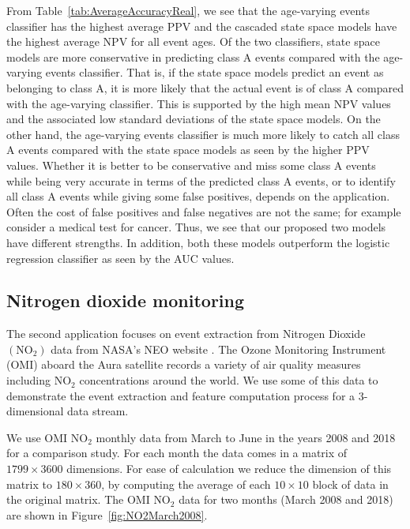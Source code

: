\documentclass[a4paper,11pt]{article}
\begin{document}
From Table~\ref{tab:AverageAccuracyReal}, we see that the age-varying events classifier has the highest average PPV and the cascaded state space models have the highest average NPV for all event ages. Of the two classifiers, state space models are more conservative in predicting class A events compared with the age-varying events classifier. That is, if the state space models predict an event as belonging to class A, it is more likely that the actual event is of class A compared with the age-varying classifier. This is supported by the high mean NPV values and the associated low standard deviations of the state space models. On the other hand, the age-varying events classifier is much more likely to catch all class A events compared with the state space models as seen by the higher PPV values. Whether it is better to be conservative and miss some class A events while being very accurate in terms of the predicted class A events, or to identify all class A events while giving some false positives, depends on the application. Often the cost of  false positives and false negatives are not the same; for example consider a medical test for cancer. Thus, we see that our proposed two models have different strengths. In addition, both these models outperform the logistic regression classifier as seen by the AUC values.  

\newpage
\subsection{Nitrogen dioxide monitoring}\label{sec:NO2Exp}

The second application focuses on event extraction from Nitrogen Dioxide $(\text{NO}_2)$ data from NASA's NEO website \cite{OMINO2}. The Ozone Monitoring Instrument (OMI) \cite{levelt2006ozone} aboard the Aura satellite records a variety of air quality measures including $\text{NO}_2$ concentrations around the world. We use some of this data to demonstrate the event extraction and feature computation process for a 3-dimensional data stream.

We use OMI $\text{NO}_2$ monthly data from March to June in the years 2008 and 2018 for a comparison study. For each month the data comes in a matrix of $1799 \times 3600$ dimensions. For ease of calculation we reduce the dimension of this matrix to $180 \times 360 $, by computing the average of each $10 \times 10$ block of data in the original matrix. The OMI $\text{NO}_2$ data for two months (March 2008 and 2018) are shown in Figure~\ref{fig:NO2March2008}.
\end{document}
